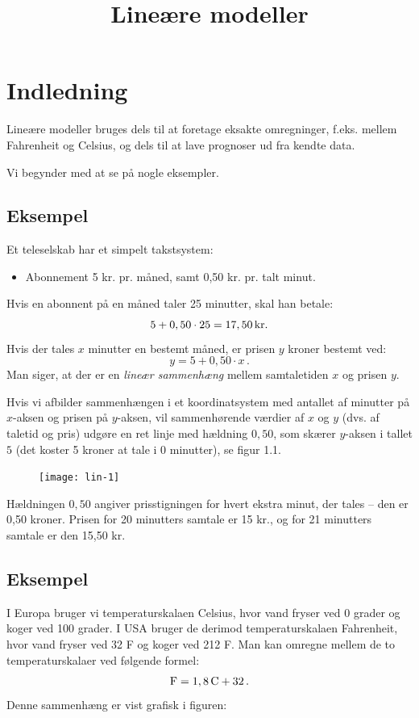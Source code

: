 \documentclass[12pt,oneside,a4paper]{article}
\title{Lineære modeller}
\date{\vspace{-5ex}}
\begin{document}
\maketitle


\section{Indledning}
Lineære modeller bruges dels til at foretage eksakte omregninger, f.eks. mellem
Fahrenheit og Celsius, og dels til at lave prognoser ud fra kendte data.

Vi begynder med at se på nogle eksempler.

\subsection{Eksempel}
Et teleselskab har et simpelt takstsystem:
\begin{itemize}
    \item Abonnement 5 kr. pr. måned, samt 0,50 kr. pr. talt minut.
\end{itemize}
Hvis en abonnent på en måned taler 25 minutter, skal han betale:
$$
5 + 0,50\cdot25 = 17,50 \, {\rm kr}.
$$
Hvis der tales $x$ minutter en bestemt måned, er prisen $y$ kroner bestemt ved:
$$
y = 5 + 0,50\cdot x \,.
$$
Man siger, at der er en {\em lineær sammenhæng} mellem samtaletiden $x$ og prisen $y$.

Hvis vi afbilder sammenhængen i et koordinatsystem med antallet af minutter på
$x$-aksen og prisen på $y$-aksen, vil sammenhørende værdier af $x$ og $y$ (dvs.
af taletid og pris) udgøre en ret linje med hældning $0,50$, som skærer
$y$-aksen i tallet $5$ (det koster 5 kroner at tale i 0 minutter), se figur
1.1.

\begin{figure}[H]
    \centering
    \texttt{[image: lin-1]}
\end{figure}

Hældningen $0,50$ angiver prisstigningen for hvert ekstra minut, der tales --
den er 0,50 kroner.  Prisen for 20 minutters samtale er 15 kr., og for 21
minutters samtale er den 15,50 kr.

\subsection{Eksempel}
I Europa bruger vi temperaturskalaen Celsius, hvor vand fryser ved 0 grader og
koger ved 100 grader.  I USA bruger de derimod temperaturskalaen Fahrenheit,
hvor vand fryser ved 32 F og koger ved 212 F.
Man kan omregne mellem de to temperaturskalaer ved følgende formel:
\[
    {\rm F} = 1,8\, {\rm C} + 32 \,.
\]
Denne sammenhæng er vist grafisk i figuren:
\end{document}
